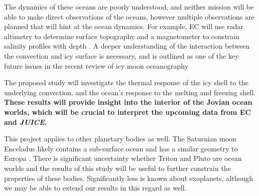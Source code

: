 \documentclass[12pt]{article}
\begin{document}
The dynamics of these oceans are poorly understood, and neither mission will be able to make direct observations of the oceans, however multiple observations are planned that will hint at the ocean dynamics. For example, EC will use radar altimetry to determine surface topography and a magnetometer to constrain salinity profiles with depth \citep{jR23}.  
A deeper understanding of the interaction between the convection and icy surface is necessary, and is outlined as one of the key future issues in the recent review of icy moon oceanography \citep{kS24}

The proposed study will investigate the thermal response of the icy shell to the underlying convection, and the ocean's response to the melting and freezing shell. 
\textbf{These results will provide insight into the interior of the Jovian ocean worlds, which will be crucial to interpret the upcoming data from EC and \textit{JUICE}.}

This project applies to other planetary bodies as well. The Saturnian moon Enceladus likely contains a sub-surface ocean and has a similar geometry to Europa \citep{kS24}. There is significant uncertainty whether Triton\citep{jK22} and Pluto\citep{kS24} are ocean worlds and the results of this study will be useful to further constrain the properties of these bodies. 
Significantly less is known about exoplanets, although we may be able to extend our results in this regard as well.
%
\end{document}
